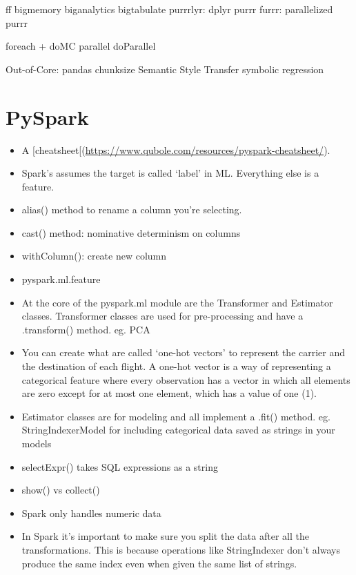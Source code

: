 \documentclass[]{book}
\begin{document}
ff \textbar{} bigmemory \textbar{} biganalytics \textbar{} bigtabulate \textbar{} purrrlyr: dplyr purrr \textbar{} furrr: parallelized purrr

foreach + doMC \textbar{} parallel \textbar{} doParallel

Out-of-Core: pandas chunksize Semantic Style Transfer symbolic regression

\hypertarget{pyspark}{%
\section{PySpark}\label{pyspark}}

\begin{itemize}
\item
  A {[}cheatsheet{[}(\url{https://www.qubole.com/resources/pyspark-cheatsheet/}).
\item
  Spark's assumes the target is called `label' in ML. Everything else is a feature.
\item
  alias() method to rename a column you're selecting.
\item
  cast() method: nominative determinism on columns
\item
  withColumn(): create new column
\item
  pyspark.ml.feature
\item
  At the core of the pyspark.ml module are the Transformer and Estimator classes. Transformer classes are used for pre-processing and have a .transform() method. eg. PCA
\item
  You can create what are called `one-hot vectors' to represent the carrier and the destination of each flight. A one-hot vector is a way of representing a categorical feature where every observation has a vector in which all elements are zero except for at most one element, which has a value of one (1).
\item
  Estimator classes are for modeling and all implement a .fit() method. eg. StringIndexerModel for including categorical data saved as strings in your models
\item
  selectExpr() takes SQL expressions as a string
\item
  show() vs collect()
\item
  Spark only handles numeric data
\item
  In Spark it's important to make sure you split the data after all the transformations. This is because operations like StringIndexer don't always produce the same index even when given the same list of strings.
\end{itemize}
\end{document}
